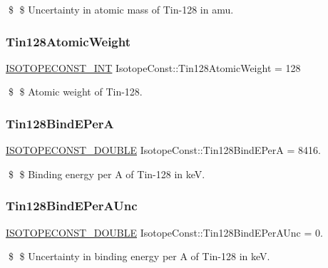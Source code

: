 \$ \$ Uncertainty in atomic mass of Tin-\/128 in amu. \mbox{\label{group___isotope_const-_tin-_sn128_ga3ff85c248adc854680dd77877308bfc2}} 
\subsubsection{\texorpdfstring{Tin128\+Atomic\+Weight}{Tin128AtomicWeight}}
{\footnotesize\ttfamily \mbox{\hyperlink{group___isotope_const-_macros_ga5f18360b3e99483a35c32d789e62621c}{I\+S\+O\+T\+O\+P\+E\+C\+O\+N\+S\+T\+\_\+\+I\+NT}} Isotope\+Const\+::\+Tin128\+Atomic\+Weight = 128}

\$ \$ Atomic weight of Tin-\/128. \mbox{\label{group___isotope_const-_tin-_sn128_gacf4b868089c278dd54d6dc0f77c7431c}} 
\subsubsection{\texorpdfstring{Tin128\+Bind\+E\+PerA}{Tin128BindEPerA}}
{\footnotesize\ttfamily \mbox{\hyperlink{group___isotope_const-_macros_ga8f45a7272ce02c0b4c65c44636ed719a}{I\+S\+O\+T\+O\+P\+E\+C\+O\+N\+S\+T\+\_\+\+D\+O\+U\+B\+LE}} Isotope\+Const\+::\+Tin128\+Bind\+E\+PerA = 8416.}

\$ \$ Binding energy per A of Tin-\/128 in keV. \mbox{\label{group___isotope_const-_tin-_sn128_ga2761fd2d04b9c7c0b2a99269ad68c8cd}} 
\subsubsection{\texorpdfstring{Tin128\+Bind\+E\+Per\+A\+Unc}{Tin128BindEPerAUnc}}
{\footnotesize\ttfamily \mbox{\hyperlink{group___isotope_const-_macros_ga8f45a7272ce02c0b4c65c44636ed719a}{I\+S\+O\+T\+O\+P\+E\+C\+O\+N\+S\+T\+\_\+\+D\+O\+U\+B\+LE}} Isotope\+Const\+::\+Tin128\+Bind\+E\+Per\+A\+Unc = 0.}

\$ \$ Uncertainty in binding energy per A of Tin-\/128 in keV. \mbox{\label{group___isotope_const-_tin-_sn128_ga262cd2233a8c60b0c945c89ccef3a00d}} 
